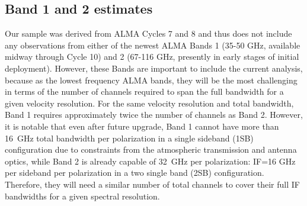 \documentclass[preprint]{aastex631}
\begin{document}

\subsection{Band 1 and 2 estimates}

Our sample was derived from ALMA Cycles 7 and 8 and thus does not include any observations from either of the newest ALMA Bands 1 (35-50 GHz, available midway through Cycle 10) and 2 (67-116 GHz, presently in early stages of initial deployment).  However, these Bands are important to include the current analysis, because as the lowest frequency ALMA bands, they will be the most challenging in terms of the number of channels required to span the full bandwidth for a given velocity resolution. For the same velocity resolution and total bandwidth, Band 1 requires approximately twice the number of channels as Band 2. However, it is notable that even after future upgrade, Band 1 cannot have more than 16~GHz total bandwidth per polarization in a single sideband (1SB) configuration due to constraints from the atmospheric transmission and antenna optics, while Band 2 is already capable of 32~GHz per polarization: IF=16 GHz per sideband per polarization in a two single band (2SB) configuration. Therefore, they will need a similar number of total channels to cover their full IF bandwidths for a given spectral resolution.
\end{document}

